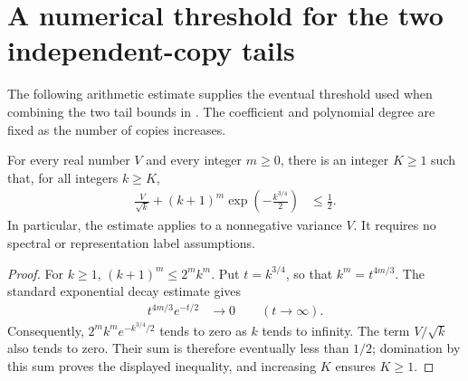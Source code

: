 \section{A numerical threshold for the two independent-copy tails}
\label{sec:iid_tail_threshold}

The following arithmetic estimate supplies the eventual threshold used when
combining the two tail bounds in \cite[Section~7]{OpenAI2026AreaLaw}.
The coefficient and polynomial degree are fixed as the number of copies
increases.

\begin{theorem}
\label{thm:iid_tail_threshold}
\leanok
For every real number $V$ and every integer $m\ge0$, there is an integer
$K\ge1$ such that, for all integers $k\ge K$,
\begin{align}
 \frac{V}{\sqrt{k}}+(k+1)^m\exp\!\left(-\frac{k^{3/4}}{2}\right)
   &\le \frac12.
 \label{eq:iid_tail_threshold}
\end{align}
In particular, the estimate applies to a nonnegative variance $V$.
It requires no spectral or representation label assumptions.
\end{theorem}
\begin{proof}
\leanok
For $k\ge1$, $(k+1)^m\le 2^mk^m$. Put $t=k^{3/4}$, so that
$k^m=t^{4m/3}$. The standard exponential decay estimate gives
\begin{align}
 t^{4m/3}e^{-t/2}&\longrightarrow0
 \qquad(t\longrightarrow\infty).
 \label{eq:iid_tail_threshold_decay}
\end{align}
Consequently, $2^mk^me^{-k^{3/4}/2}$ tends to zero as $k$ tends to
infinity. The term $V/\sqrt{k}$ also tends to zero. Their sum is therefore
eventually less than $1/2$; domination by this sum proves the displayed
inequality, and increasing $K$ ensures $K\ge1$.
\end{proof}
